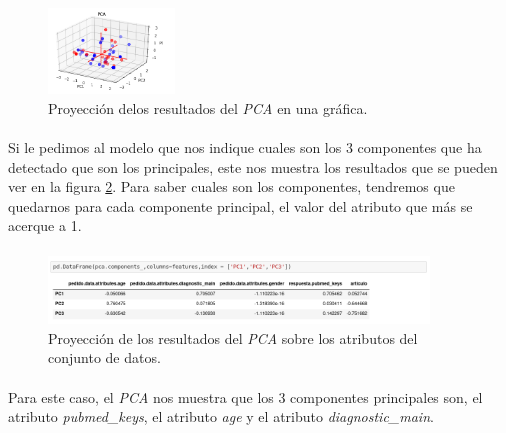 \paragraph{}
\begin{figure}[!htb]
  \centering
    \includegraphics[width=0.3\textwidth]{images/resultados_procesado_de_datos_pca1_graphic.png}
    \caption{Proyección delos resultados del \textit{PCA} en una gráfica.}
  \label{pcaOneGraphic}
\end{figure}

\paragraph{}
Si le pedimos al modelo que nos indique cuales son los 3 componentes que ha detectado que son los principales, este nos muestra los resultados que se pueden ver en la figura \ref{pcaOneAtributos}. Para saber cuales son los componentes, tendremos que quedarnos para cada componente principal, el valor del atributo que más se acerque a 1.

\paragraph{}
\begin{figure}[!htb]
  \centering
    \includegraphics[width=0.9\textwidth]{images/resultados_procesado_de_datos_pca1_atributos.png}
    \caption{Proyección de los resultados del \textit{PCA} sobre los atributos del conjunto de datos.}
  \label{pcaOneAtributos}
\end{figure}

\paragraph{}
Para este caso, el \textit{PCA} nos muestra que los 3 componentes principales son, el atributo \textit{pubmed\_keys}, el atributo \textit{age} y el atributo \textit{diagnostic\_main}.


